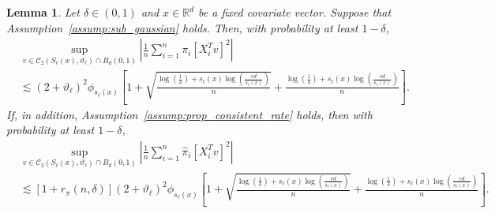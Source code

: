 \documentclass[10pt,a4paper]{amsart}
\theoremstyle{plain}
\newtheorem{lemma}[theorem]{Lemma}
\theoremstyle{remark}
\renewcommand{\hat}{\widehat}
\begin{document}
\begin{lemma}
	\label{lem:rel_poly_cost}
	Let $\delta\in (0,1)$ and $x\in \mathbb{R}^d$ be a fixed covariate vector. Suppose that Assumption~\ref{assump:sub_gaussian} holds. Then, with probability at least $1-\delta$,
	\begin{align*}
		&\sup_{v\in \mathcal{C}_2\left(S_{\ell}(x), \vartheta_{\ell}\right)\cap B_d(0,1)} \left|\frac{1}{n} \sum_{i=1}^n \pi_i\left[X_i^Tv\right]^2 \right| \\
		&\lesssim (2+\vartheta_{\ell})^2 \phi_{s_{\ell}(x)}\left[1+\sqrt{\frac{\log(\frac{1}{\delta})+s_{\ell}(x)\log\left(\frac{ed}{s_{\ell}(x)}\right)}{n}} + \frac{\log(\frac{1}{\delta})+s_{\ell}(x)\log\left(\frac{ed}{s_{\ell}(x)}\right)}{n}\right].
	\end{align*}
	If, in addition, Assumption~\ref{assump:prop_consistent_rate} holds, then with probability at least $1-\delta$,
	\begin{align*}
		&\sup_{v\in \mathcal{C}_2\left(S_{\ell}(x), \vartheta_{\ell}\right)\cap B_d(0,1)} \left|\frac{1}{n} \sum_{i=1}^n \hat{\pi}_i\left[X_i^Tv\right]^2 \right| \\
		&\lesssim \left[1+r_{\pi}(n,\delta)\right] (2+\vartheta_{\ell})^2 \phi_{s_{\ell}(x)}\left[1+\sqrt{\frac{\log(\frac{1}{\delta})+s_{\ell}(x)\log\left(\frac{ed}{s_{\ell}(x)}\right)}{n}} + \frac{\log(\frac{1}{\delta})+s_{\ell}(x)\log\left(\frac{ed}{s_{\ell}(x)}\right)}{n}\right].
	\end{align*}
\end{lemma}
\end{document}

